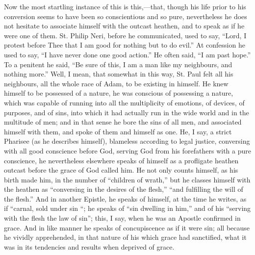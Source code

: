 Now the most startling instance of this is
this,—that, though his life prior to his conversion
seems to have been so conscientious and so pure,
nevertheless he does not hesitate to associate himself
with the outcast heathen, and to speak as if he were one
of them. St. Philip Neri, before he communicated, used to
say, ``Lord, I protest before Thee that I am good for
nothing but to do evil.'' At confession he used to
say, ``I have never done one good action.'' He
often said, ``I am past hope.'' To a penitent he
said, ``Be sure of this, I am a man like my
neighbours, and nothing more.'' Well, I mean, that
somewhat in this way, St. Paul felt all his neighbours,
all the whole race of Adam, to be existing in himself. He
knew himself to be possessed of a nature, he was
conscious of possessing a nature, which was capable of
running into all the multiplicity of emotions, of
devices, of purposes, and of sins, into which it had
actually run in the wide world and in the multitude of
men; and in that sense he bore the sins of all men, and
associated himself with them, and spoke of them and
himself as one. He, I say, a strict Pharisee (as he
describes himself), blameless according to legal justice,
conversing with all good conscience before God, serving
God from his forefathers with a pure conscience, he
nevertheless elsewhere speaks of himself as a profligate
heathen outcast before the grace of God called him. He not only counts himself, as his birth made him, in the
number of ``children of wrath,'' but he classes
himself with the heathen as ``conversing in the
desires of the flesh,'' ``and fulfilling the will
of the flesh.'' And in another Epistle, he speaks of
himself, at the time he writes, as if ``carnal, sold
under sin ``; he speaks of ``sin dwelling in
him,'' and of his ``serving with the flesh the
law of sin''; this, I say, when he was an Apostle
confirmed in grace. And in like manner he speaks of
concupiscence as if it were sin; all because he vividly
apprehended, in that nature of his which grace had
sanctified, what it was in its tendencies and results
when deprived of grace.

